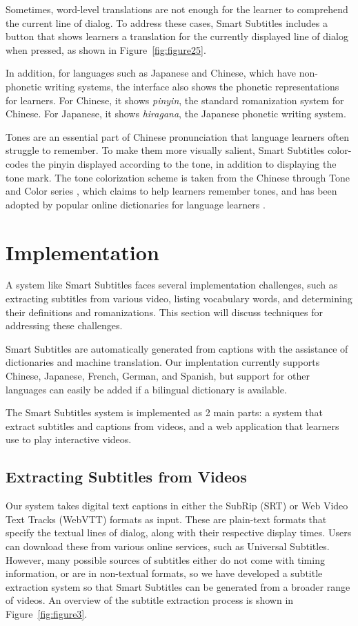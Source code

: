 \documentclass{sigchi}
\begin{document}
Sometimes, word-level translations are not enough for the learner to comprehend the current line of dialog. To address these cases, Smart Subtitles includes a button that shows learners a translation for the currently displayed line of dialog when pressed, as shown in Figure~\ref{fig:figure25}.

In addition, for languages such as Japanese and Chinese, which have non-phonetic writing systems, the interface also shows the phonetic representations for learners. For Chinese, it shows \emph{pinyin}, the standard romanization system for Chinese. For Japanese, it shows \emph{hiragana}, the Japanese phonetic writing system.

Tones are an essential part of Chinese pronunciation that language learners often struggle to remember. To make them more visually salient, Smart Subtitles color-codes the pinyin displayed according to the tone, in addition to displaying the tone mark. The tone colorization scheme is taken from the Chinese through Tone and Color series \cite{tonecolor}, which claims to help learners remember tones, and has been adopted by popular online dictionaries for language learners \cite{mdbg}.

\section{Implementation}

A system like Smart Subtitles faces several implementation challenges, such as extracting subtitles from various video, listing vocabulary words, and determining their definitions and romanizations. This section will discuss techniques for addressing these challenges.

Smart Subtitles are automatically generated from 
captions with the assistance of dictionaries and 
machine translation. Our implentation currently supports Chinese, Japanese, French, German, and Spanish, but support for other languages can easily be added if a bilingual dictionary is available.

The Smart Subtitles system
is implemented as 2 main parts:
a system that extract subtitles and captions from videos,
and a web application that learners use to play interactive videos.

\subsection{Extracting Subtitles from Videos}

Our system takes digital text captions in either the SubRip (SRT) \cite{subrip} or Web Video Text Tracks (WebVTT) formats \cite{webvtt} as input.
These are plain-text formats that specify the textual lines of dialog, along with their respective display times.
Users can download these from
various online services, such as Universal Subtitles.
However, many possible sources of subtitles either
do not come with timing information, or are in
non-textual formats, so we have developed 
a subtitle extraction system so that Smart Subtitles
can be generated from a broader range of videos.
An overview of the subtitle extraction process
is shown in Figure~\ref{fig:figure3}.
\end{document}
